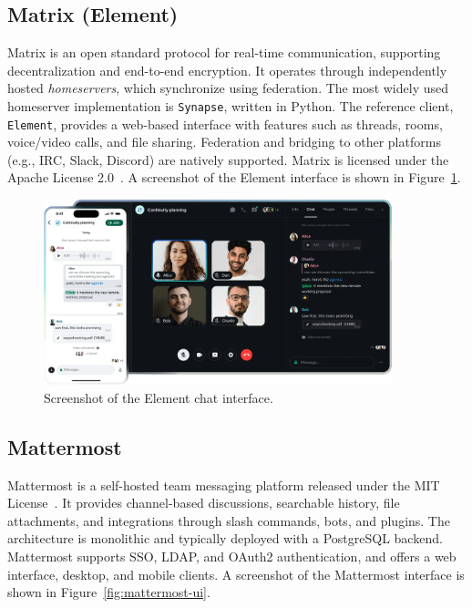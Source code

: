 \subsection*{Matrix (Element)}

Matrix is an open standard protocol for real-time communication, supporting decentralization and end-to-end encryption. It operates through independently hosted \emph{homeservers}, which synchronize using federation. The most widely used homeserver implementation is \texttt{Synapse}, written in Python. The reference client, \texttt{Element}, provides a web-based interface with features such as threads, rooms, voice/video calls, and file sharing. Federation and bridging to other platforms (e.g., IRC, Slack, Discord) are natively supported. Matrix is licensed under the Apache License 2.0~\cite{matrix-docs}. A screenshot of the Element interface is shown in Figure~\ref{fig:element-ui}.

\begin{figure}[h!]
  \centering
  \includegraphics[width=0.9\textwidth]{imaxes/element-ui.png}
  \caption{Screenshot of the Element chat interface.}
  \label{fig:element-ui}
\end{figure}

\subsection*{Mattermost}

Mattermost is a self-hosted team messaging platform released under the MIT License~\cite{mattermost-docs}. It provides channel-based discussions, searchable history, file attachments, and integrations through slash commands, bots, and plugins. The architecture is monolithic and typically deployed with a PostgreSQL backend. Mattermost supports SSO, LDAP, and OAuth2 authentication, and offers a web interface, desktop, and mobile clients. A screenshot of the Mattermost interface is shown in Figure~\ref{fig:mattermost-ui}.

